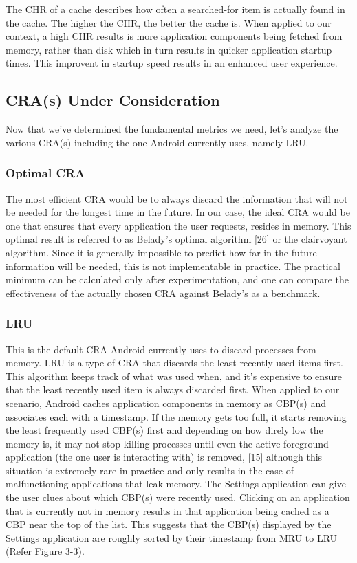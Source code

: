 \documentclass[12pt]{uthesis-v12}  %
\begin{document}
			The CHR of a cache describes how often a searched-for item is actually found in the cache. The higher the CHR, the better the cache is. When applied to our context, a high CHR results is more application components being fetched from memory, rather than disk which in turn results in quicker application startup times. This improvent in startup speed results in an enhanced user experience.   
		
		\subsection{CRA(s) Under Consideration}
			Now that we've determined the fundamental metrics we need, let's analyze the various CRA(s) including the one Android currently uses, namely LRU.
			
			\subsubsection{Optimal CRA}
				The most efficient CRA would be to always discard the information that will not be needed for the longest time in the future. In our case, the ideal CRA would be one that ensures that every application the user requests, resides in memory. This optimal result is referred to as Belady's optimal algorithm [26] or the clairvoyant algorithm. Since it is generally impossible to predict how far in the future information will be needed, this is not implementable in practice. The practical minimum can be calculated only after experimentation, and one can compare the effectiveness of the actually chosen CRA against Belady's as a benchmark.
			
			\subsubsection{LRU}
				This is the default CRA Android currently uses to discard processes from memory. LRU is a type of CRA that discards the least recently used items first. This algorithm keeps track of what was used when, and it's expensive to ensure that the least recently used item is always discarded first. When applied to our scenario, Android caches application components in memory as CBP(s) and associates each with a timestamp. If the memory gets too full, it starts removing the least frequently used CBP(s) first and depending on how direly low the memory is, it may not stop killing processes until even the active foreground application (the one user is interacting with) is removed, [15] although this situation is extremely rare in practice and only results in the case of malfunctioning applications that leak memory. The Settings application can give the user clues about which CBP(s) were recently used. Clicking on an application that is currently not in memory results in that application being cached as a CBP near the top of the list. This suggests that the CBP(s) displayed by the Settings application are roughly sorted by their timestamp from MRU to LRU (Refer Figure 3-3). 
				
\end{document}
